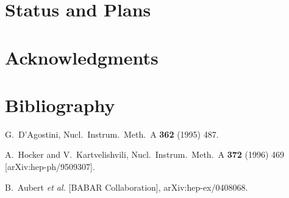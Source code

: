 \documentclass{desyproc}
\begin{document}
\section{Status and Plans}

\section{Acknowledgments}

\section{Bibliography}


\begin{footnotesize}

\begin{thebibliography}{99}

  G.~D'Agostini,
  Nucl.\ Instrum.\ Meth.\  A {\bf 362} (1995) 487.

  A.~Hocker and V.~Kartvelishvili,
  Nucl.\ Instrum.\ Meth.\  A {\bf 372} (1996) 469
  [arXiv:hep-ph/9509307].

  B.~Aubert {\it et al.}  [BABAR Collaboration],
  arXiv:hep-ex/0408068.

\end{thebibliography}

\end{footnotesize}

\end{document}
